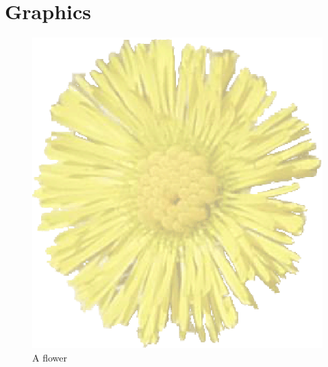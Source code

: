 \documentclass[a4paper,10pt]{article}
\begin{document}
\section{Graphics}
\begin{figure}[h]
 \begin{center}
  \includegraphics{flower.eps}
 \end{center}
 \caption{A flower}
 \label{specifikation}
\end{figure}
\end{document}
